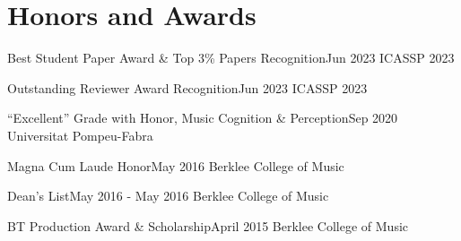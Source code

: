 \section{Honors and Awards}
\resumeSubHeadingListStart

    \resumeSubheading
    {Best Student Paper Award \& Top 3\% Papers Recognition}{Jun 2023}
    {ICASSP 2023}{}
    \resumeItemListStart
    \resumeItemListEnd

    \resumeSubheading
    {Outstanding Reviewer Award Recognition}{Jun 2023}
    {ICASSP 2023}{}
    \resumeItemListStart
    \resumeItemListEnd

    \resumeSubheading
    {``Excellent'' Grade with Honor, Music Cognition \& Perception}{Sep 2020}
    {Universitat Pompeu-Fabra}{}

    \resumeSubheading
    {Magna Cum Laude Honor}{May 2016}
    {Berklee College of Music}{}

    \resumeSubheading
    {Dean's List}{May 2016 - May 2016}
    {Berklee College of Music}{}
    \resumeItemListStart
    \resumeItemListEnd

    \resumeSubheading
    {BT Production Award \& Scholarship}{April 2015}
    {Berklee College of Music}{}
    \resumeItemListStart
    \resumeItemListEnd

\resumeSubHeadingListEnd